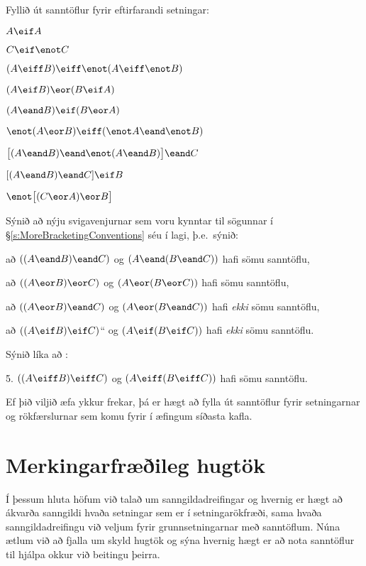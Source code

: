 \practiceproblems
\problempart
Fyllið út sanntöflur fyrir eftirfarandi setningar:
\begin{earg}
\item $A \eif A$ %
\item $C \eif\enot C$ %
\item $(A \eiff B) \eiff \enot(A\eiff \enot B)$ %
\item $(A \eif B) \eor (B \eif A)$ %
\item $(A \eand B) \eif (B \eor A)$  %
\item $\enot(A \eor B) \eiff (\enot A \eand \enot B)$ %
\item $\bigl[(A\eand B) \eand\enot(A\eand B)\bigr] \eand C$ %
\item $[(A \eand B) \eand C] \eif B$ %
\item $\enot\bigl[(C\eor A) \eor B\bigr]$ %
\end{earg}
\problempart
Sýnið að nýju svigavenjurnar sem voru kynntar til sögunnar í \S\ref{s:MoreBracketingConventions} séu í lagi, þ.e.\ sýnið:
\begin{earg}
	\item að $((A \eand B) \eand C)$ og $(A \eand (B \eand C))$ hafi sömu sanntöflu,
	\item að $((A \eor B) \eor C)$ og $(A \eor (B \eor C))$ hafi sömu sanntöflu,
	\item að $((A \eor B) \eand C)$ og $(A \eor (B \eand C))$ hafi \emph{ekki} sömu sanntöflu,
	\item að $((A \eif B) \eif C)$“ og $(A \eif (B \eif C))$ hafi \emph{ekki} sömu sanntöflu.
\end{earg}
Sýnið líka að :
\begin{earg}
	\item[5.] $((A \eiff B) \eiff C)$ og $(A \eiff (B \eiff C))$ hafi sömu sanntöflu.
\end{earg}

Ef þið viljið æfa ykkur frekar, þá er hægt að fylla út sanntöflur fyrir setningarnar og rökfærslurnar sem komu fyrir í æfingum síðasta kafla.

\chapter{Merkingarfræðileg hugtök}\label{s:semanticconcepts}

Í þessum hluta höfum við talað um sanngildadreifingar og hvernig er hægt að ákvarða sanngildi hvaða setningar sem er í setningarökfræði, sama hvaða sanngildadreifingu við veljum fyrir grunnsetningarnar með sanntöflum. Núna ætlum við að fjalla um skyld hugtök og sýna hvernig hægt er að nota sanntöflur til hjálpa okkur við beitingu þeirra.

